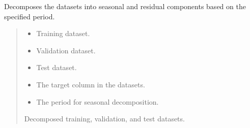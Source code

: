 \documentclass[letterpaper,10pt,english]{sphinxmanual}
\begin{document}
\begin{fulllineitems}
\label{\detokenize{docs/time_series_analysis:time_series_analysis.prepare_seasonal_sets}}
\pysigstartsignatures
{}
\pysigstopsignatures
\sphinxAtStartPar
Decomposes the datasets into seasonal and residual components based on the specified period.
\begin{quote}\begin{description}
\begin{itemize}
\item {} 
\sphinxAtStartPar
{} \textendash{} Training dataset.

\item {} 
\sphinxAtStartPar
{} \textendash{} Validation dataset.

\item {} 
\sphinxAtStartPar
{} \textendash{} Test dataset.

\item {} 
\sphinxAtStartPar
{} \textendash{} The target column in the datasets.

\item {} 
\sphinxAtStartPar
{} \textendash{} The period for seasonal decomposition.

\end{itemize}

\sphinxAtStartPar
Decomposed training, validation, and test datasets.

\end{description}\end{quote}

\end{fulllineitems}

\end{document}
